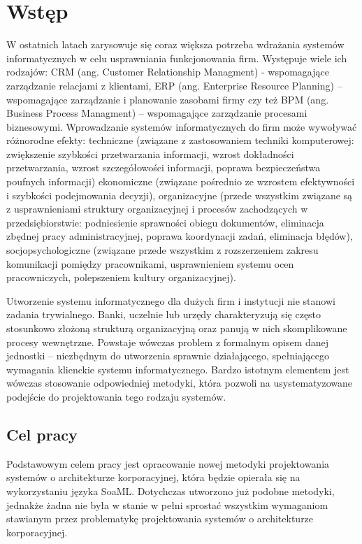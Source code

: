 \chapter{Wstęp}
W ostatnich latach zarysowuje się coraz większa potrzeba wdrażania systemów informatycznych w celu usprawniania funkcjonowania firm. Występuje wiele ich rodzajów: CRM (ang. Customer Relationship Managment) - wspomagające zarządzanie relacjami z klientami, ERP (ang. Enterprise Resource Planning) – wspomagające zarządzanie i planowanie zasobami firmy czy też BPM (ang. Business Process Managment) – wspomagające zarządzanie procesami biznesowymi. Wprowadzanie systemów informatycznych do firm może wywoływać różnorodne efekty: techniczne (związane z zastosowaniem techniki komputerowej: zwiększenie szybkości przetwarzania informacji, wzrost dokładności przetwarzania, wzrost szczegółowości informacji, poprawa bezpieczeństwa poufnych informacji) ekonomiczne (związane pośrednio ze wzrostem efektywności i szybkości podejmowania decyzji), organizacyjne (przede wszystkim związane są z usprawnieniami struktury organizacyjnej i procesów zachodzących w przedsiębiorstwie: podniesienie sprawności obiegu dokumentów, eliminacja zbędnej pracy administracyjnej, poprawa koordynacji zadań, eliminacja błędów), socjopsychologiczne (związane przede wszystkim z rozszerzeniem zakresu komunikacji pomiędzy pracownikami, usprawnieniem systemu ocen pracowniczych, polepszeniem kultury organizacyjnej). \cite{EfektyZasSys}

Utworzenie systemu informatycznego dla dużych firm i instytucji nie stanowi zadania trywialnego. Banki, uczelnie lub urzędy charakteryzują się często stosunkowo złożoną strukturą organizacyjną oraz panują w nich skomplikowane procesy wewnętrzne. Powstaje wówczas problem z formalnym opisem danej jednostki – niezbędnym do utworzenia sprawnie działającego, spełniającego wymagania klienckie systemu informatycznego. Bardzo istotnym elementem jest wówczas stosowanie odpowiedniej metodyki, która pozwoli na usystematyzowane podejście do projektowania tego rodzaju systemów. 

\section{Cel pracy}
Podstawowym celem pracy jest opracowanie nowej metodyki projektowania systemów o architekturze korporacyjnej, która będzie opierała się na wykorzystaniu języka SoaML. Dotychczas utworzono już podobne metodyki, jednakże żadna nie była w stanie w pełni sprostać wszystkim wymaganiom stawianym przez problematykę projektowania systemów o architekturze korporacyjnej. 

